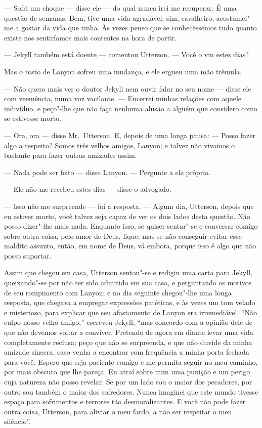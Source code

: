--- Sofri um choque --- disse ele --- do qual nunca irei me recuperar.  É
uma questão de semanas.  Bem, tive uma vida agradável; sim, cavalheiro,
acostumei"-me a gostar da vida que tinha.  Às vezes penso que se
conhecêssemos tudo quanto existe nos sentiríamos mais contentes na hora
de partir.

--- Jekyll também está doente --- comentou Utterson. --- Você o viu estes
dias?

Mas o rosto de Lanyon sofreu uma mudança, e ele ergueu uma mão trêmula.

--- Não quero mais ver o doutor Jekyll nem ouvir falar no seu nome ---
disse ele com veemência, numa voz vacilante. --- Encerrei minhas relações
com aquele indivíduo, e peço"-lhe que não faça nenhuma alusão a alguém
que considero como se estivesse morto.

--- Ora, ora --- disse Mr.~Utterson.  E, depois de uma longa pausa: ---
Posso fazer algo a respeito?  Somos três velhos amigos, Lanyon; e
talvez não vivamos o bastante para fazer outras amizades assim.

--- Nada pode ser feito --- disse Lanyon. --- Pergunte a ele próprio.

--- Ele não me recebeu estes dias --- disse o advogado.

--- Isso não me surpreende --- foi a resposta. --- Algum dia, Utterson,
depois que eu estiver morto, você talvez seja capaz de ver os dois lados desta
questão.  Não posso dizer"-lhe mais nada.  Enquanto isso, se quiser
sentar"-se e conversar comigo sobre outra coisa, pelo amor de Deus,
fique; mas se não conseguir evitar esse maldito assunto, então, em nome
de Deus, vá embora, porque isso é algo que não posso suportar.

Assim que chegou em casa, Utterson sentou"-se e redigiu uma carta para
Jekyll, queixando"-se por não ter sido admitido em sua casa, e
perguntando os motivos de seu rompimento com Lanyon; e no
dia seguinte chegou"-lhe uma longa resposta, que chegava a empregar
expressões patéticas, e às vezes um tom velado e misterioso, para
explicar que seu afastamento de Lanyon era irremediável.  “Não culpo
nosso velho amigo,” escreveu Jekyll, “mas concordo com a opinião dele
de que não devemos voltar a conviver.  Pretendo de agora em diante
levar uma vida completamente reclusa; peço que não se surpreenda, e que
não duvide da minha amizade sincera, caso venha a encontrar com
frequência a minha porta fechada para você.  Espero que seja paciente
comigo e me permita seguir no meu caminho, por mais obscuro que lhe
pareça.  Eu atraí sobre mim uma punição e um perigo cuja natureza não
posso revelar.  Se por um lado sou o maior dos pecadores, por outro sou
também o maior dos sofredores.  Nunca imaginei que este mundo tivesse
espaço para sofrimentos e terrores tão desmoralizantes.  E você não
pode fazer outra coisa, Utterson, para aliviar o meu fardo, a não ser
respeitar o meu silêncio”.

